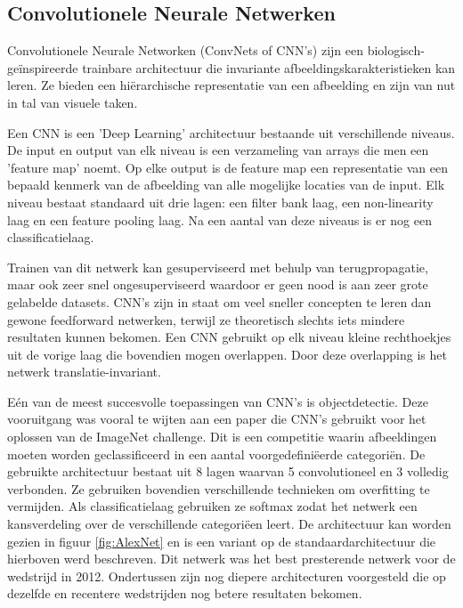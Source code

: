 \subsection{Convolutionele Neurale Netwerken}
Convolutionele Neurale Networken (ConvNets of CNN's) zijn een biologisch- ge\" inspireerde trainbare architectuur die invariante afbeeldingskarakteristieken kan leren. \cite{LeCun2010} Ze bieden een hi\"erarchische representatie van een afbeelding en zijn van nut in tal van visuele taken.\cite{Girshick2014}\cite{ciresan2012multi}\cite{lawrence1997face}

Een CNN is een 'Deep Learning' architectuur bestaande uit verschillende niveaus. De input en output van elk niveau is een verzameling van arrays die men een 'feature map' noemt. Op elke output is de feature map een representatie van een bepaald kenmerk van de afbeelding van alle mogelijke locaties van de input. Elk niveau bestaat standaard uit drie lagen: een filter bank laag, een non-linearity laag en een feature pooling laag. Na een aantal van deze niveaus is er nog een classificatielaag.

Trainen van dit netwerk kan gesuperviseerd met behulp van terugpropagatie, maar ook zeer snel ongesuperviseerd waardoor er geen nood is aan zeer grote gelabelde datasets. CNN's zijn in staat om veel sneller concepten te leren dan gewone feedforward netwerken, terwijl ze theoretisch slechts iets mindere resultaten kunnen bekomen. Een CNN gebruikt op elk niveau kleine rechthoekjes uit de vorige laag die bovendien mogen overlappen. Door deze overlapping is het netwerk translatie-invariant.

E\'en van de meest succesvolle toepassingen van CNN's is objectdetectie. Deze vooruitgang was vooral te wijten aan een paper\cite{Krizhevsky2012a} die CNN's gebruikt voor het oplossen van de ImageNet challenge.\cite{ILSVRC15}
Dit is een competitie waarin afbeeldingen moeten worden geclassificeerd in een aantal voorgedefini\"eerde categori\"en. De gebruikte architectuur bestaat uit 8 lagen waarvan 5 convolutioneel en 3 volledig verbonden. Ze gebruiken bovendien verschillende technieken om overfitting te vermijden. Als classificatielaag gebruiken ze softmax zodat het netwerk een kansverdeling over de verschillende categori\"een leert. De architectuur kan worden gezien in figuur \ref{fig:AlexNet} en  is een variant op de standaardarchitectuur die hierboven werd beschreven. Dit netwerk was het best presterende netwerk voor de wedstrijd in 2012. Ondertussen zijn nog diepere architecturen voorgesteld die op dezelfde en recentere wedstrijden nog betere resultaten bekomen. 

